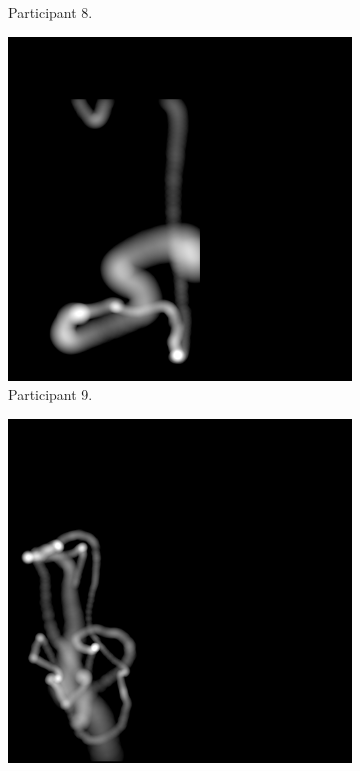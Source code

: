 \begin{figure}[!ht]
\begin{subfigure}[b]{0.24\textwidth}
        \caption{Participant 8.}
    \end{subfigure}
    \hfill    
    \begin{subfigure}[b]{0.24\textwidth}
        \centering
        \includegraphics[width=\textwidth]{img/data/Panel17/single/9.png}
        \caption{Participant 9.}
    \end{subfigure}
    \hfill    
    \begin{subfigure}[b]{0.24\textwidth}
        \centering
        \includegraphics[width=\textwidth]{img/data/Panel17/single/10.png}

\end{subfigure}
\end{figure}
